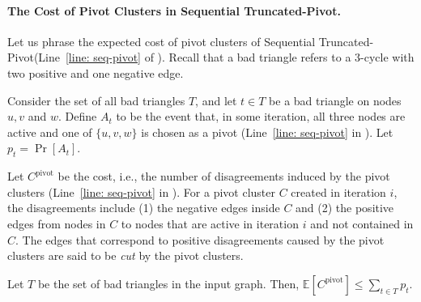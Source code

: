 \documentclass{theoretics}
\newcommand{\E}{\mathbb{E}}
\newcommand{\seqtruncatedpivot}{Sequential \textrm{Truncated-Pivot}\xspace}
\newcommand{\ourcluster}{\ensuremath{C^{\textrm{pivot}}}\xspace}
\begin{document}
\paragraph{The Cost of Pivot Clusters in \seqtruncatedpivot.}
Let us phrase the expected cost of pivot clusters of \seqtruncatedpivot (Line~\ref{line: seq-pivot} of ).
Recall that a bad triangle refers to a $3$-cycle with two positive and one negative edge.


\begin{definition} 
    Consider the set of all bad triangles $T$, and let $t \in T$ be a bad triangle on nodes $u, v$ and $w$.
    Define $A_t$ to be the event that, in some iteration, all three nodes are active and one of $\{u, v, w\}$ is chosen as a pivot (Line~\ref{line: seq-pivot} in ). Let $p_t = \Pr[A_t]$.
\end{definition}

\begin{definition} \label{def: pivotcost}
    Let $\ourcluster$ be the cost, i.e., the number of disagreements induced by the pivot clusters (Line~\ref{line: seq-pivot} in ). 
    For a pivot cluster $C$ created in iteration $i$, the disagreements include (1) the negative edges inside $C$ and (2) the positive edges from nodes in $C$ to nodes that are active in iteration $i$ and not contained in $C$.
    The edges that correspond to positive disagreements caused by the pivot clusters are said to be \emph{cut} by the pivot clusters.
\end{definition}


\begin{lemma}
    Let $T$ be the set of bad triangles in the input graph.
    Then, $\E[\ourcluster] \leq \sum_{t \in T} p_t$.
    \label{lemma: expected cost}
\end{lemma}
\end{document}
